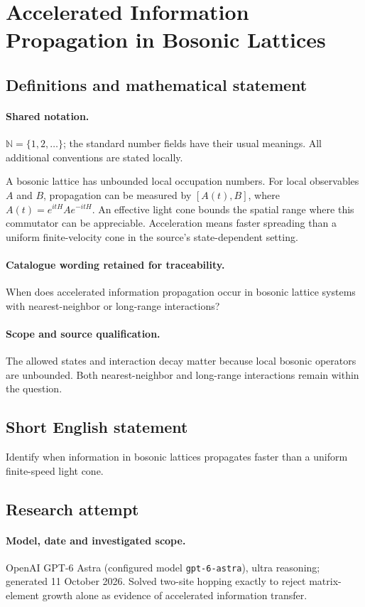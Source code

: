 \documentclass[11pt]{article}
\begin{document}
\section{Accelerated Information Propagation in Bosonic Lattices}\label{statement}

\subsection{Definitions and mathematical statement}

\paragraph{Shared notation.}$\mathbb N=\{1,2,\ldots\}$; the standard number fields have their usual meanings. All additional conventions are stated locally.


A bosonic lattice has unbounded local occupation numbers. For local observables $A$ and $B$, propagation can be measured by $[A(t),B]$, where $A(t)=e^{itH}Ae^{-itH}$. An effective light cone bounds the spatial range where this commutator can be appreciable. Acceleration means faster spreading than a uniform finite-velocity cone in the source's state-dependent setting.

\paragraph{Catalogue wording retained for traceability.}
When does accelerated information propagation occur in bosonic lattice systems with nearest-neighbor or long-range interactions?

\paragraph{Scope and source qualification.}The allowed states and interaction decay matter because local bosonic operators are unbounded. Both nearest-neighbor and long-range interactions remain within the question.
\subsection{Short English statement}
Identify when information in bosonic lattices propagates faster than a uniform finite-speed light cone.
\subsection{Research attempt}
\paragraph{Model, date and investigated scope.}
OpenAI GPT-6 Astra (configured model \texttt{gpt-6-astra}), ultra reasoning; generated 11 October 2026. Solved two-site hopping exactly to reject matrix-element growth alone as evidence of accelerated information transfer.
\end{document}
